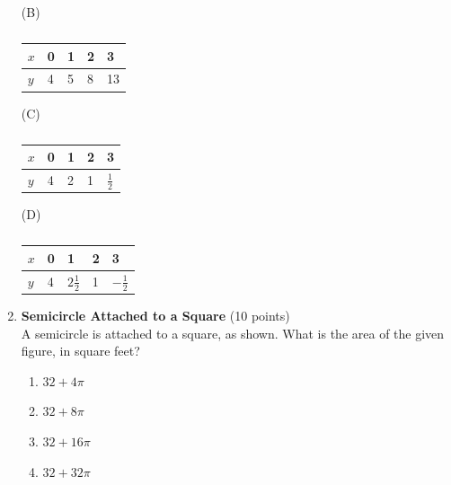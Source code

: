 \begin{enumerate}
  \noindent (B)
  \begin{table}[h!]
  \centering
  \renewcommand{\arraystretch}{1.3}
  \setlength{\tabcolsep}{14pt}
  \caption*{}
  \begin{tabular}{|l|l|l|l|l|}
  \hline
  \rowcolor[HTML]{E0E0E0}
  $x$ & 0 & 1 & 2 & 3 \\
  \hline
  $y$ & 4 & 5 & 8 & 13 \\
  \hline
  \end{tabular}
  \end{table}

  \noindent (C)
  \begin{table}[h!]
  \centering
  \renewcommand{\arraystretch}{1.3}
  \setlength{\tabcolsep}{14pt}
  \caption*{}
  \begin{tabular}{|l|l|l|l|l|}
  \hline
  \rowcolor[HTML]{E0E0E0}
  $x$ & 0 & 1 & 2 & 3 \\
  \hline
  $y$ & 4 & 2 & 1 & $\tfrac{1}{2}$ \\
  \hline
  \end{tabular}
  \end{table}

  \noindent (D)
  \begin{table}[h!]
  \centering
  \renewcommand{\arraystretch}{1.3}
  \setlength{\tabcolsep}{14pt}
  \caption*{}
  \begin{tabular}{|l|l|l|l|l|}
  \hline
  \rowcolor[HTML]{E0E0E0}
  $x$ & 0 & 1 & 2 & 3 \\
  \hline
  $y$ & 4 & $2\tfrac{1}{2}$ & 1 & $-\tfrac{1}{2}$ \\
  \hline
  \end{tabular}
  \end{table}

  \begin{subanswer}
  \end{subanswer}







  \newpage




  \item \textbf{Semicircle Attached to a Square} (10 points)\\
  A semicircle is attached to a square, as shown.
  What is the area of the given figure, in square feet?
  \begin{enumerate}[label=(\Alph*)]
    \item $32 + 4\pi$
    \item $32 + 8\pi$
    \item $32 + 16\pi$
    \item $32 + 32\pi$
  \end{enumerate}
  \begin{subanswer}
  \end{subanswer}


\end{enumerate}
